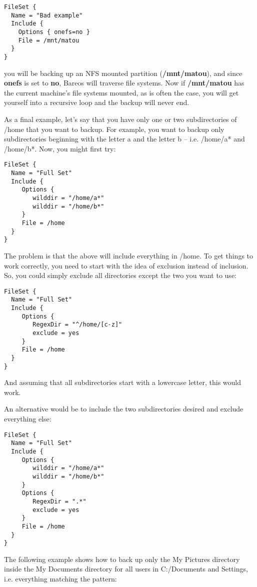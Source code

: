 \footnotesize
\begin{verbatim}
FileSet {
  Name = "Bad example"
  Include {
    Options { onefs=no }
    File = /mnt/matou
  }
}
\end{verbatim}
\normalsize

you will be backing up an NFS mounted partition ({\bf /mnt/matou}), and since
{\bf onefs} is set to {\bf no}, Bareos will traverse file systems. Now if {\bf
/mnt/matou} has the current machine's file systems mounted, as is often the
case, you will get yourself into a recursive loop and the backup will never
end.

As a final example, let's say that you have only one or two
subdirectories of /home that you want to backup.  For example,
you want to backup only subdirectories beginning with the letter
a and the letter b -- i.e. /home/a* and /home/b*.  Now, you might first
try:
\footnotesize
\begin{verbatim}
FileSet {
  Name = "Full Set"
  Include {
     Options {
        wilddir = "/home/a*"
        wilddir = "/home/b*"
     }
     File = /home
  }
}
\end{verbatim}
\normalsize

The problem is that the above will include everything in /home.  To get
things to work correctly, you need to start with the idea of exclusion
instead of inclusion.  So, you could simply exclude all directories
except the two you want to use:
\footnotesize
\begin{verbatim}
FileSet {
  Name = "Full Set"
  Include {
     Options {
        RegexDir = "^/home/[c-z]"
        exclude = yes
     }
     File = /home
  }
}
\end{verbatim}
\normalsize

And assuming that all subdirectories start with a lowercase letter, this
would work.

An alternative would be to include the two subdirectories desired and
exclude everything else:
\footnotesize
\begin{verbatim}
FileSet {
  Name = "Full Set"
  Include {
     Options {
        wilddir = "/home/a*"
        wilddir = "/home/b*"
     }
     Options {
        RegexDir = ".*"
        exclude = yes
     }
     File = /home
  }
}
\end{verbatim}
\normalsize


The following example shows how to back up only the My Pictures directory inside
the My Documents directory for all users in C:/Documents and Settings, i.e.
everything matching the pattern:

